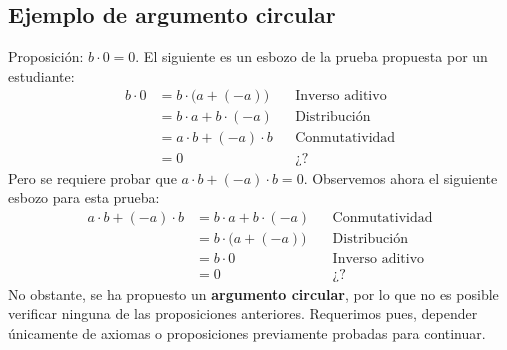 \documentclass[11pt]{article}
\begin{document}
\subsection*{Ejemplo de argumento circular}
%
%
Proposición: $b\cdot 0 = 0$. El siguiente es un esbozo de la prueba propuesta por un estudiante:
%
%
 \begin{align*}
 b\cdot 0 &= b\cdot \bigl(a+ (-a)\bigr) && \text{Inverso aditivo}\\
 &= b\cdot a + b\cdot (-a) && \text{Distribución}\\
 &= a\cdot b + (-a) \cdot b && \text{Conmutatividad}\\
 &= 0 && \text{¿?}
\end{align*}
Pero se requiere probar que $a\cdot b+(-a)\cdot b=0$. Observemos ahora el siguiente esbozo para esta prueba:  \begin{align*}
 a\cdot b+ (-a) \cdot b &= b\cdot a + b\cdot (-a) && \text{Conmutatividad}\\
 &= b\cdot \bigl(a+(-a)\bigr) && \text{Distribución}\\
 &= b\cdot 0 && \text{Inverso aditivo}\\
 &= 0 && \text{¿?}
\end{align*}
No obstante, se ha propuesto un \textbf{argumento circular}, por lo que no es posible verificar ninguna de las proposiciones anteriores. Requerimos pues, depender únicamente de axiomas o proposiciones previamente probadas para continuar.
\end{document}
